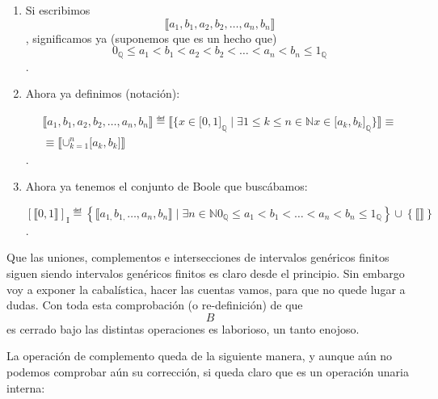 \begin{enumerate}
\begin{enumerate}
\begin{enumerate}
      \[⟦{a_{1},b_{1},a_{2},b_{2},\ldots,a_{n},b_{n}}⟧\]definirán los
      elementos de
      \[\mathbf{\mathrm{I}}_{\mathbb{Q}}^{\mathbf{\mathrm{GEN}}}\],
      aparte de
      \[{⟦⟧} ≝ {{{{⟦\varnothing ⟧} = {⟦{\{ 0\}}⟧}} = {⟦{\{ 1\}}⟧}} = 0_{\mathbf{\mathrm{I}}_{B}^{\mathbf{\mathrm{GEN}}}}}\].
    \item
      Si escribimos \[⟦{a_{1},b_{1},a_{2},b_{2},\ldots,a_{n},b_{n}}⟧\],
      significamos ya (suponemos que es un hecho que)
      \[{{{{{{{0_{\mathbb{Q}} \leq a_{1}} < b_{1}} < a_{2}} < b_{2}} < \ldots} < a_{n}} < b_{n}} \leq 1_{\mathbb{Q}}\].
    \item
      Ahora ya definimos (notación):

      \[\begin{matrix}
      {{⟦{a_{1},b_{1},a_{2},b_{2},\ldots,a_{n},b_{n}}⟧} ≝ {{⟦{\{{{x \in {\lbrack 0,1\rbrack}_{\mathbb{Q}}} \mid \exists{{{1 \leq k} \leq n} \in \mathbb{N}}{x \in {\lbrack{a_{k},b_{k}}\rbrack}_{\mathbb{Q}}}}\}}⟧} \equiv}} \\
      {\equiv {⟦{\mathbf{\cup}_{k = 1}^{n}{\lbrack{a_{k},b_{k}}\rbrack}}⟧}}
      \end{matrix}\].
    \item
      Ahora ya tenemos el conjunto de Boole que buscábamos:

      \[\left\lbrack {⟦0,1⟧} \right\rbrack_{\mathbf{\mathrm{I}}} ≝ {\left\{ {{⟦{a_{1,}b_{1,}\ldots,a_{n},b_{n}}⟧} \mid {\exists{n \in \mathbb{N}}{{{{{{0_{\mathbb{Q}} \leq a_{1}} < b_{1}} < \ldots} < a_{n}} < b_{n}} \leq 1_{\mathbb{Q}}}}} \right\} \cup \left\{ {⟦⟧} \right\}}\].
    \end{enumerate}
  \end{enumerate}

  Que las uniones, complementos e intersecciones de intervalos genéricos
  finitos siguen siendo intervalos genéricos finitos es claro desde el
  principio. Sin embargo voy a exponer la cabalística, hacer las cuentas
  vamos, para que no quede lugar a dudas. Con toda esta comprobación (o
  re-definición) de que \[B\] es cerrado bajo las distintas operaciones
  es laborioso, un tanto enojoso.

  La operación de complemento queda de la siguiente manera, y aunque aún
  no podemos comprobar aún su corrección, si queda claro que es un
  operación unaria interna:


\end{enumerate}
